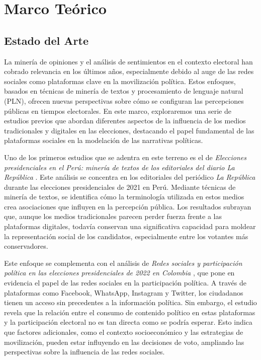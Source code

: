 \documentclass[10pt, a4paper]{article}
\begin{document}
	
	\section{Marco Teórico}
	
	\subsection{Estado del Arte}
	La minería de opiniones y el análisis de sentimientos en el contexto electoral han cobrado relevancia en los últimos años, especialmente debido al auge de las redes sociales como plataformas clave en la movilización política. Estos enfoques, basados en técnicas de minería de textos y procesamiento de lenguaje natural (PLN), ofrecen nuevas perspectivas sobre cómo se configuran las percepciones públicas en tiempos electorales. En este marco, exploraremos una serie de estudios previos que abordan diferentes aspectos de la influencia de los medios tradicionales y digitales en las elecciones, destacando el papel fundamental de las plataformas sociales en la modelación de las narrativas políticas.
	
	Uno de los primeros estudios que se adentra en este terreno es el de \textit{Elecciones presidenciales en el Perú: minería de textos de los editoriales del diario La República} \parencite{Castro2021}. Este análisis se concentra en los editoriales del periódico \textit{La República} durante las elecciones presidenciales de 2021 en Perú. Mediante técnicas de minería de textos, se identifica cómo la terminología utilizada en estos medios crea asociaciones que influyen en la percepción pública. Los resultados subrayan que, aunque los medios tradicionales parecen perder fuerza frente a las plataformas digitales, todavía conservan una significativa capacidad para moldear la representación social de los candidatos, especialmente entre los votantes más conservadores.
	
	Este enfoque se complementa con el análisis de \textit{Redes sociales y participación política en las elecciones presidenciales de 2022 en Colombia} \parencite{Ramirez2022}, que pone en evidencia el papel de las redes sociales en la participación política. A través de plataformas como Facebook, WhatsApp, Instagram y Twitter, los ciudadanos tienen un acceso sin precedentes a la información política. Sin embargo, el estudio revela que la relación entre el consumo de contenido político en estas plataformas y la participación electoral no es tan directa como se podría esperar. Esto indica que factores adicionales, como el contexto socioeconómico y las estrategias de movilización, pueden estar influyendo en las decisiones de voto, ampliando las perspectivas sobre la influencia de las redes sociales.
	
\end{document}
